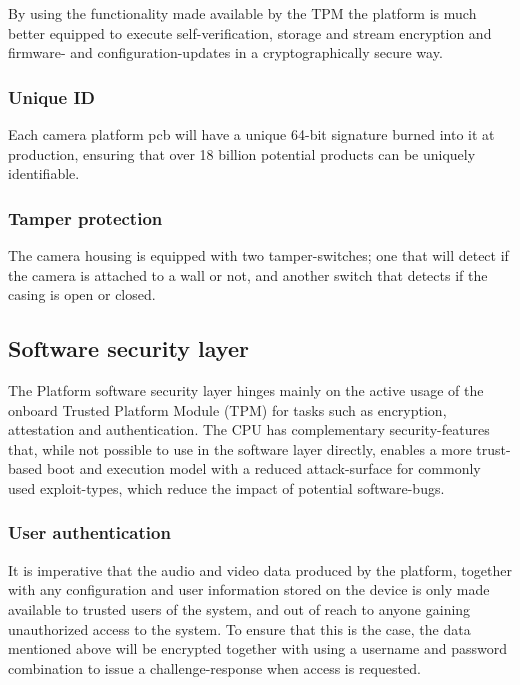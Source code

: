 \documentclass[10pt]{article}
\begin{document}
        By using the functionality made available by the TPM the platform is
        much better equipped to execute self-verification, storage and stream
        encryption and firmware- and configuration-updates in a cryptographically
        secure way.

      \subsubsection{Unique ID}

        Each camera platform pcb will have a unique 64-bit signature burned
        into it at production, ensuring that over 18 billion potential products
        can be uniquely identifiable.

      \subsubsection{Tamper protection}

        The camera housing is equipped with two tamper-switches; one that
        will detect if the camera is attached to a wall or not, and another
        switch that detects if the casing is open or closed.

    \subsection{Software security layer}

      The Platform software security layer hinges mainly on the active usage of
      the onboard Trusted Platform Module (TPM) for tasks such as encryption,
      attestation and authentication. The CPU has complementary
      security-features that, while not possible to use in the software layer
      directly, enables a more trust-based boot and execution model with a
      reduced attack-surface for commonly used exploit-types, which reduce the
      impact of potential software-bugs.

      \subsubsection{User authentication}

        It is imperative that the audio and video data produced by the
        platform, together with any configuration and user information stored
        on the device is only made available to trusted users of the system,
        and out of reach to anyone gaining unauthorized access to the system.
        To ensure that this is the case, the data mentioned above will be
        encrypted together with using a username and password combination to
        issue a challenge-response when access is requested.
\end{document}
